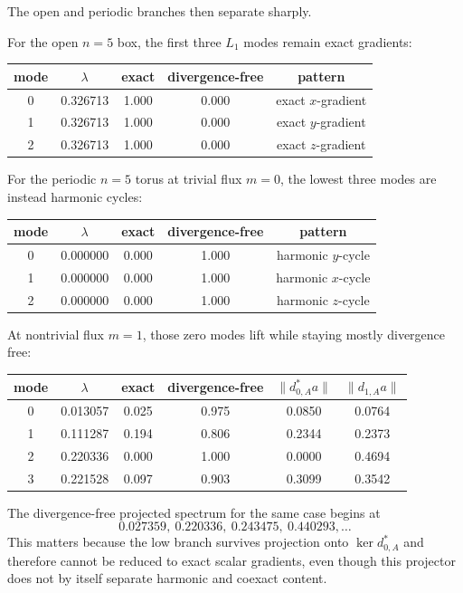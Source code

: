\documentclass[11pt]{article}
\begin{document}
The open and periodic branches then separate sharply.

For the open $n=5$ box, the first three $L_1$ modes remain exact gradients:
\begin{center}
\begin{tabular}{@{}ccccc@{}}
\toprule
mode & $\lambda$ & exact & divergence-free & pattern \\
\midrule
0 & 0.326713 & 1.000 & 0.000 & exact $x$-gradient \\
1 & 0.326713 & 1.000 & 0.000 & exact $y$-gradient \\
2 & 0.326713 & 1.000 & 0.000 & exact $z$-gradient \\
\bottomrule
\end{tabular}
\end{center}

For the periodic $n=5$ torus at trivial flux $m=0$, the lowest three modes are instead harmonic cycles:
\begin{center}
\begin{tabular}{@{}ccccc@{}}
\toprule
mode & $\lambda$ & exact & divergence-free & pattern \\
\midrule
0 & 0.000000 & 0.000 & 1.000 & harmonic $y$-cycle \\
1 & 0.000000 & 0.000 & 1.000 & harmonic $x$-cycle \\
2 & 0.000000 & 0.000 & 1.000 & harmonic $z$-cycle \\
\bottomrule
\end{tabular}
\end{center}

At nontrivial flux $m=1$, those zero modes lift while staying mostly divergence free:
\begin{center}
\begin{tabular}{@{}cccccc@{}}
\toprule
mode & $\lambda$ & exact & divergence-free & $\|d_{0,A}^* a\|$ & $\|d_{1,A} a\|$ \\
\midrule
0 & 0.013057 & 0.025 & 0.975 & 0.0850 & 0.0764 \\
1 & 0.111287 & 0.194 & 0.806 & 0.2344 & 0.2373 \\
2 & 0.220336 & 0.000 & 1.000 & 0.0000 & 0.4694 \\
3 & 0.221528 & 0.097 & 0.903 & 0.3099 & 0.3542 \\
\bottomrule
\end{tabular}
\end{center}

The divergence-free projected spectrum for the same case begins at
\begin{equation}
0.027359,\ 0.220336,\ 0.243475,\ 0.440293, \dots
\end{equation}
This matters because the low branch survives projection onto $\ker d_{0,A}^*$ and therefore cannot be reduced to exact scalar gradients, even though this projector does not by itself separate harmonic and coexact content.
\end{document}
